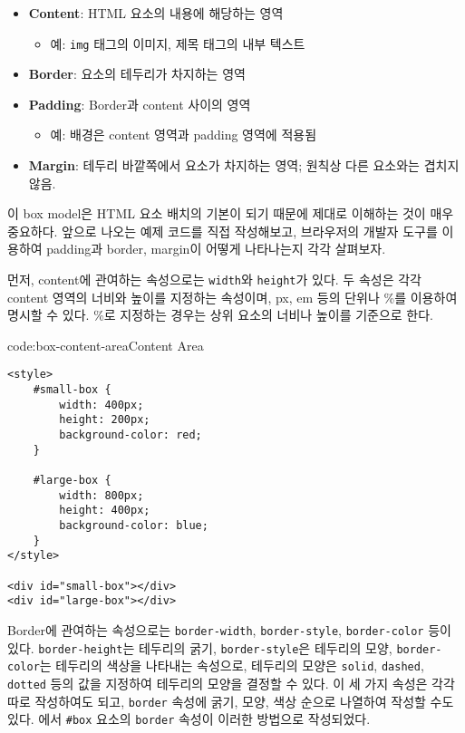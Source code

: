 \begin{itemize}
    \item \textbf{Content}: HTML 요소의 내용에 해당하는 영역
    \begin{itemize}
        \item 예: \texttt{img} 태그의 이미지, 제목 태그의 내부 텍스트
    \end{itemize}
    \item \textbf{Border}: 요소의 테두리가 차지하는 영역
    \item \textbf{Padding}: Border과 content 사이의 영역
    \begin{itemize}
        \item 예: 배경은 content 영역과 padding 영역에 적용됨
    \end{itemize}
    \item \textbf{Margin}: 테두리 바깥쪽에서 요소가 차지하는 영역; 원칙상 다른 요소와는 겹치지 않음.
\end{itemize}

    {}

이 box model은 HTML 요소 배치의 기본이 되기 때문에 제대로 이해하는 것이 매우 중요하다. 앞으로 나오는 예제 코드를 직접 작성해보고, 브라우저의 개발자 도구를 이용하여 padding과 border, margin이 어떻게 나타나는지 각각 살펴보자.

먼저, content에 관여하는 속성으로는 \texttt{width}와 \texttt{height}가 있다. 두 속성은 각각 content 영역의 너비와 높이를 지정하는 속성이며, px, em 등의 단위나 \%를 이용하여 명시할 수 있다. \%로 지정하는 경우는 상위 요소의 너비나 높이를 기준으로 한다.

\begin{codeenv}{code:box-content-area}{Content Area}\begin{verbatim}
<style>
    #small-box {
        width: 400px;
        height: 200px;
        background-color: red;
    }

    #large-box {
        width: 800px;
        height: 400px;
        background-color: blue;
    }
</style>

<div id="small-box"></div>
<div id="large-box"></div>
\end{verbatim}
\end{codeenv}

Border에 관여하는 속성으로는 \texttt{border-width}, \texttt{border-style}, \texttt{border-color} 등이 있다. \texttt{border-height}는 테두리의 굵기, \texttt{border-style}은 테두리의 모양, \texttt{border-color}는 테두리의 색상을 나타내는 속성으로, 테두리의 모양은 \texttt{solid}, \texttt{dashed}, \texttt{dotted} 등의 값을 지정하여 테두리의 모양을 결정할 수 있다. 이 세 가지 속성은 각각 따로 작성하여도 되고, \texttt{border} 속성에 굵기, 모양, 색상 순으로 나열하여 작성할 수도 있다. 에서 \texttt{\#box} 요소의 \texttt{border} 속성이 이러한 방법으로 작성되었다. 

